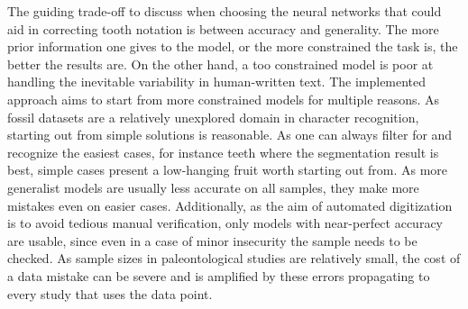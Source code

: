 \documentclass[english,twoside,openright]{UH_DS_MSc}
\begin{document}
The guiding trade-off to discuss when choosing the neural networks that could aid in correcting
tooth notation is between accuracy and generality. The more prior information one gives to 
the model, or the more constrained the task is, the better the results are. On the other hand, a too
constrained model is poor at handling the inevitable variability in human-written text.
The implemented approach aims to start from more constrained models for multiple reasons. 
As fossil datasets are a relatively unexplored domain in character recognition, starting out from simple
solutions is reasonable. As one can always filter for and recognize the easiest 
cases, for instance teeth where the segmentation result is best,
simple cases present a low-hanging fruit worth starting out from. As more generalist 
models are usually less accurate on all samples, they make more mistakes even on
easier cases. Additionally, as the aim of automated digitization is to avoid tedious manual verification,
 only models with near-perfect accuracy are usable, since even in a case of minor insecurity the sample needs to be checked.
As sample sizes in paleontological studies are relatively small, the cost of a data mistake
can be severe and is amplified by these errors propagating to every study that uses the data point.
\end{document}
